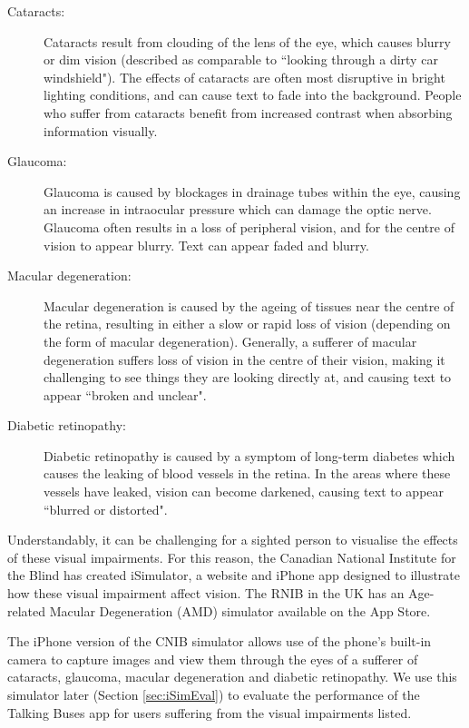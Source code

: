 \documentclass[10pt,twocolumn]{article}
\newcommand{\citep}[1]{}
\begin{document}
\begin{description}
\item[Cataracts:] 
Cataracts result from clouding of the lens of the eye, which causes blurry or dim vision (described as comparable to ``looking through a dirty car windshield"\citep{eyesmart}). The effects of cataracts are often most disruptive in bright lighting conditions, and can cause text to fade into the background. People who suffer from cataracts benefit from increased contrast when absorbing information visually.

\item[Glaucoma:]
Glaucoma is caused by blockages in drainage tubes within the eye, causing an increase in intraocular pressure which can damage the optic nerve. Glaucoma often results in a loss of peripheral vision, and for the centre of vision to appear blurry. Text can appear faded and blurry.

\item[Macular degeneration:]
Macular degeneration is caused by the ageing of tissues near the centre of the retina, resulting in either a slow or rapid loss of vision (depending on the form of macular degeneration). Generally, a sufferer of macular degeneration suffers loss of vision in the centre of their vision, making it challenging to see things they are looking directly at, and causing text to appear ``broken and unclear".

\item[Diabetic retinopathy:]
Diabetic retinopathy is caused by a symptom of long-term diabetes which causes the leaking of blood vessels in the retina. In the areas where these vessels have leaked, vision can become darkened, causing text to appear ``blurred or distorted".
\end{description}
%
Understandably, it can be challenging for a sighted person to visualise the effects of these visual impairments. For this reason, the Canadian National Institute for the Blind has created iSimulator, a website and iPhone app designed to illustrate how these visual impairment affect vision\citep{iSimulator}.  The RNIB in the UK has an  Age-related Macular Degeneration (AMD) simulator available on the App Store.

The iPhone version of the CNIB simulator allows use of the phone's built-in camera to capture images and view them through the eyes of a sufferer of cataracts, glaucoma, macular degeneration and diabetic retinopathy. We use this simulator later (Section \ref{sec:iSimEval}) to evaluate the performance of the Talking Buses app for users suffering from the visual impairments listed.
\end{document}
